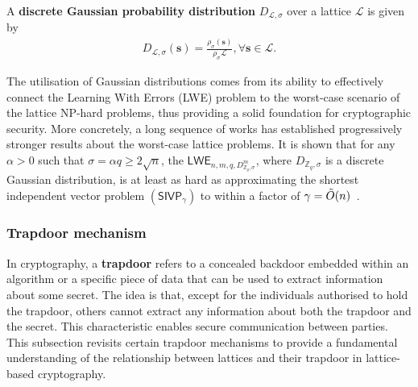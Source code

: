 \documentclass[cryptography,review,submit,pdftex,moreauthors,amsmath,amssymb,aps,strict]{Definitions/mdpi}
\begin{document}
A \textbf{discrete Gaussian probability distribution} $D_{\mathcal{L},\sigma}$ over a lattice $\mathcal{L}$ is given by
\begin{align}
    D_{\mathcal{L},\sigma}(\mathbf{s})=\displaystyle{\frac{\rho_{\sigma}(\mathbf{s})}{\rho_{\sigma}{\mathcal{L}}}}, \forall \mathbf{s}\in\mathcal{L}.
\end{align}


The utilisation of Gaussian distributions comes from its ability to effectively connect the Learning With Errors (LWE) problem to the worst-case scenario of the lattice NP-hard problems, thus providing a solid foundation for cryptographic security. More concretely, a long sequence of works has established progressively stronger results about the worst-case lattice problems. It is shown that for any $\alpha>0$ such that $\sigma=\alpha q \geq 2\sqrt{n}$, the $\mathsf{LWE}_{n,m,q, D^m_{\mathbb{Z}_q,\sigma}}$, where $D_{\mathbb{Z}_q,\sigma}$ is a discrete Gaussian distribution, is at least as hard as approximating the shortest independent vector problem $(\mathsf{SIVP}_{\gamma})$ to within a factor of $\gamma = \Tilde{O}(n)$~\cite{Reg09,RPS17}.





\subsubsection{Trapdoor mechanism}

In cryptography, a \textbf{trapdoor} refers to a concealed backdoor embedded within an algorithm or a specific piece of data that can be used to extract information about some secret. The idea is that, except for the individuals authorised to hold the trapdoor, others cannot extract any information about both the trapdoor and the secret. This characteristic enables secure communication between parties. This subsection revisits certain trapdoor mechanisms to provide a fundamental understanding of the relationship between lattices and their trapdoor in lattice-based cryptography.
\end{document}
